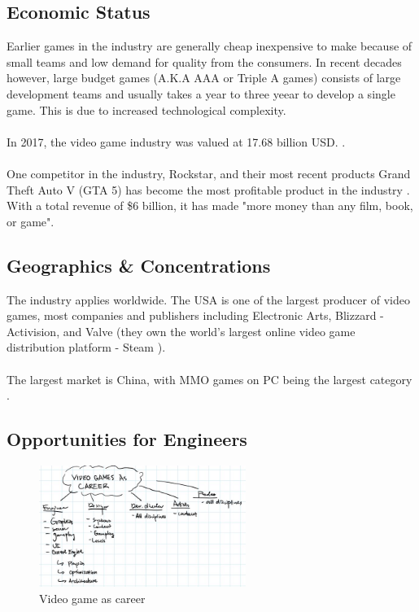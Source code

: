 \documentclass[10pt,letterpaper]{article}
\begin{document}
\subsection{Economic Status}

Earlier games in the industry are generally cheap inexpensive to make because of small teams and low demand for quality from the consumers. In recent decades however, large budget games (A.K.A AAA or Triple A games) consists of large development teams and usually takes  a year to three yeear to develop a single game. This is due to increased technological complexity.\cite{cost-game}\\
\\
In 2017, the video game industry was valued at 17.68 billion USD. \cite{video-game-industry-stats}.\\
\\
One competitor in the industry, Rockstar, and their most recent products Grand Theft Auto V (GTA 5) has become the most profitable product in the industry \cite{IGN-gta5}. With a total revenue of \$6 billion, it has made "more money than any film, book, or game".\\

\subsection{Geographics \& Concentrations}

The industry applies worldwide. The USA is one of the largest producer of video games, most companies and publishers including Electronic Arts, Blizzard - Activision, and Valve (they own the world's largest online video game distribution platform - Steam \cite{steam}).\\
\\
The largest market is China, with MMO games on PC being the largest category \cite{video-game-china}\cite{big-game-china}.

\subsection{Opportunities for Engineers}

\begin{figure}[H]
	\centering
	\includegraphics[width=0.6\textwidth]{assets/video-games-career-roles}
	\caption{Video game as career}
\end{figure}
\end{document}
